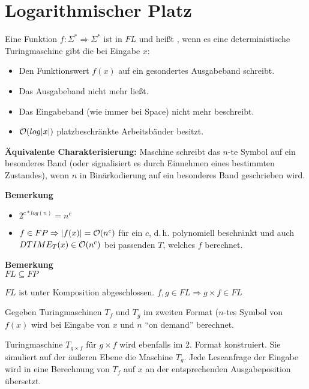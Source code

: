 

\section{Logarithmischer Platz}


Eine Funktion $f: \Sigma^\ast \Rightarrow \Sigma^\ast$ ist in $FL$ und
heißt , wenn es eine
deterministische Turingmaschine gibt die bei Eingabe $x$:

\begin{itemize}
\item Den Funktionswert $f(x)$ auf ein gesondertes Ausgabeband schreibt.
\item Das Ausgabeband nicht mehr ließt.
\item Das Eingabeband (wie immer
bei Space) nicht mehr beschreibt.
\item $\mathcal{O}(log|x|)$ platzbeschränkte Arbeitsbänder besitzt.
\end{itemize}

\textbf{Äquivalente Charakterisierung:}
Maschine schreibt das $n$-te Symbol auf
ein besonderes Band (oder signalisiert es durch Einnehmen eines
bestimmten Zustandes), wenn $n$ in Binärkodierung auf ein besonderes
Band geschrieben wird.

\textbf{Bemerkung}\\
\begin{itemize}
\item $2^{c*log(n)}=n^c$
\item $f \in FP \Rightarrow |f(x)| = \mathcal{O}(n^c)$
für ein $c$, d.\,h. polynomiell beschränkt und auch $DTIME_T(x) \in \mathcal{O}(n^c)$
bei passenden $T$, welches $f$ berechnet.
\end{itemize}

\textbf{Bemerkung}\\
$FL \subseteq FP$
\begin{satz}
    $FL$ ist unter Komposition abgeschlossen.
    $f,g \in FL \Rightarrow g \times f \in FL$
\end{satz}

Gegeben Turingmaschinen $T_f$ und $T_g$ im zweiten Format ($n$-tes Symbol von
$f(x)$ wird bei Eingabe von $x$ und $n$ ``on demand'' berechnet.

Turingmaschine $T_{g \times f}$ für $g \times f $ wird ebenfalls im
2. Format konstruiert. Sie simuliert auf der äußeren Ebene die
Maschine $T_g$.  Jede Leseanfrage der Eingabe wird in eine Berechnung
von $T_f$ auf $x$ an der entsprechenden Ausgabeposition übersetzt.





